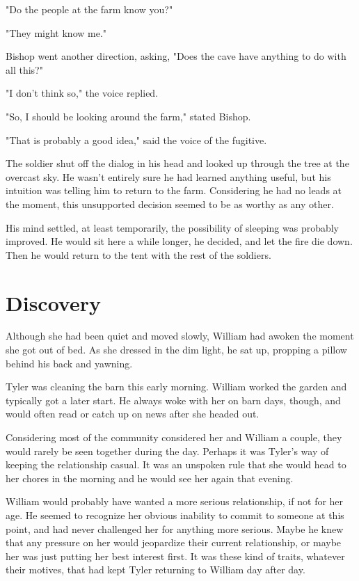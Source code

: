 \documentclass[courier]{sffms}
\begin{document}
"Do the people at the farm know you?"

"They might know me."

Bishop went another direction, asking, 
"Does the cave have anything to do with
all this?"

"I don't think so," the voice replied.

"So, I should be looking around the farm,"
stated Bishop.

"That is probably a good idea," said the
voice of the fugitive.

The soldier shut off the dialog in his head
and looked up through the tree at the overcast sky.
He wasn't entirely sure he had learned anything
useful, but his intuition was telling him to
return to the farm. Considering he had no leads
at the moment, this unsupported decision
seemed to be as worthy as any other.

His mind settled, at least temporarily, 
the possibility of sleeping was probably
improved. He would sit here a while
longer, he decided, and let the fire die
down. Then he would return to the tent
with the rest of the soldiers.

\chapter{Discovery}
Although she had been quiet and moved
slowly, William had awoken the moment she
got out of bed. As she dressed in the dim
light, he sat up, propping a pillow behind
his back and yawning.

Tyler was cleaning the barn this early morning.
William worked the garden and typically got
a later start. He always woke with her on
barn days, though, and would often read or
catch up on news after she headed out.

Considering most of the community considered
her and William a couple, they would rarely be
seen together during the day. Perhaps it was
Tyler's way of keeping the relationship casual.
It was an unspoken rule that she would head
to her chores in the morning and he would see
her again that evening.

William would probably have wanted a more
serious relationship, if not for her age. He seemed
to recognize her obvious inability to commit
to someone at this point, and had never
challenged her for anything more serious.
Maybe he knew that any pressure on her
would jeopardize their current relationship, or 
maybe her was just putting her best interest
first. It was these kind of traits, whatever
their motives, that had kept Tyler returning to
William day after day.
\end{document}

